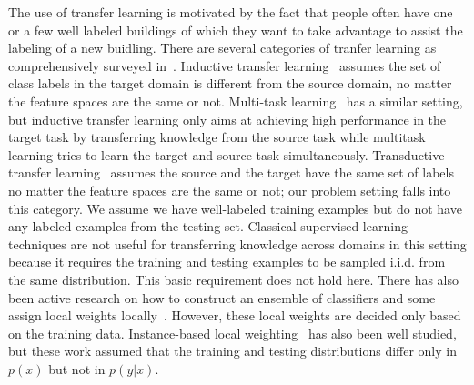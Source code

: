 The use of transfer learning is motivated by the fact that people often have one or a few well labeled buildings of which they want to take advantage to assist the labeling of a new buidling.
There are several categories of tranfer learning as comprehensively surveyed in~\cite{transfer1}. 
Inductive transfer learning~\cite{transfer2} assumes the set of class labels in the target domain is different from the source domain, no matter the feature spaces are the same or not. 
Multi-task learning~\cite{multitask} has a similar setting, but inductive transfer learning only aims at achieving high performance in the target task by transferring knowledge from the source task while multitask learning tries to learn the target and source task simultaneously. 
Transductive transfer learning~\cite{transfer3} assumes the source and the target have the same set of labels no matter the feature spaces are the same or not; our problem setting falls into this category. 
We assume we have well-labeled training examples but do not have any labeled examples from the testing set.
Classical supervised learning techniques are not useful for transferring knowledge across domains in this setting because it requires the training and testing examples to be sampled i.i.d. from the same distribution. This basic requirement does not hold here.
There has also been active research on how to construct an ensemble of classifiers and some assign local weights
locally~\cite{ensem1,ensem2}. However, these local weights are decided only based on the training data.
Instance-based local weighting~\cite{weight1,weight2,weight3} has also been well studied, but these work assumed that the training and testing distributions differ only in $p(x)$ but not in $p(y|x)$.


